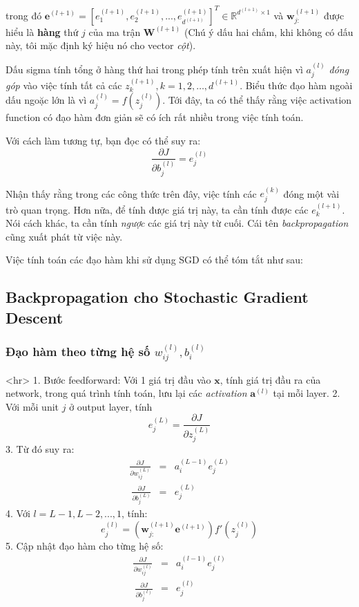 trong đó $\mathbf{e}^{(l+1)} = [e_1^{(l+1)}, e_2^{(l+1)}, ..., e_{d^{(l+1)}}^{(l+1)}]^T \in \mathbb{R}^{d^{(l+1)}\times 1} $ và $\mathbf{w}_{j:}^{(l+1)}$ được hiểu là \textbf{hàng} thứ $j$ của ma trận $\mathbf{W}^{(l+1)}$ (Chú ý dấu hai chấm, khi không có dấu này, tôi mặc định ký hiệu nó cho vector \textit{cột}). 
 
Dấu sigma tính tổng ở hàng thứ hai trong phép tính trên xuất hiện vì $a_{j}^{(l)}$ \textit{đóng góp} vào việc tính tất cả các $z_k^{(l+1)}, k = 1, 2, \dots, d^{(l+1)}$. Biểu thức đạo hàm ngoài dấu ngoặc lớn là vì $a_j^{(l)}  = f(z_j^{(l)})$. Tới đây, ta có thể thấy rằng việc activation function có đạo hàm đơn giản sẽ có ích rất nhiều trong việc tính toán. 
 
Với cách làm tương tự, bạn đọc có thể suy ra: 
\begin{equation*} 
\frac{\partial J}{\partial b_j^{(l)}} = e_j^{(l)} 
\end{equation*} 
 
Nhận thấy rằng trong các công thức trên đây, việc tính các $e_j^{(k)}$ đóng một vài trò quan trọng. Hơn nữa, để tính được giá trị này, ta cần tính được các $e_k^{(l+1)}$. Nói cách khác, ta cần tính \textit{ngược} các giá trị này từ cuối. Cái tên \textit{backpropagation} cũng xuất phát từ việc này. 
 
Việc tính toán các đạo hàm khi sử dụng SGD có thể tóm tắt như sau: 
 
 
\subsection{Backpropagation cho Stochastic Gradient Descent}
 
 
\subsubsection{Đạo hàm theo từng hệ số $w_{ij}^{(l)}, b_{i}^{(l)}$}
<hr> 
1. Bước feedforward: Với 1 giá trị đầu vào $\mathbf{x}$, tính giá trị đầu ra của network, trong quá trình tính toán, lưu lại các \textit{activation} $\mathbf{a}^{(l)}$ tại mỗi layer. 
2. Với mỗi unit $j$ ở output layer, tính \begin{equation*}e_j^{(L)} = \frac{\partial J}{\partial z_j^{(L)}}\end{equation*} 
3. Từ đó suy ra: 
\begin{eqnarray} 
\frac{\partial J}{\partial w_{ij}^{(L)}} &=& a_i^{(L-1)}e_j^{(L)} \\\ 
\frac{\partial J}{\partial b_{j}^{(L)}} &=& e_j^{(L)} 
\end{eqnarray} 
4. Với $l = L-1, L-2, ..., 1$, tính: 
\begin{equation*} 
e_j^{(l)} = \left( \mathbf{w}_{j:}^{(l+1)} \mathbf{e}^{(l+1)} \right) f'(z_j^{(l)}) 
\end{equation*} 
5. Cập nhật đạo hàm cho từng hệ số: 
\begin{eqnarray} 
\frac{\partial J}{\partial w_{ij}^{(l)}} &=& a_i^{(l-1)} e_j^{(l)} \\\ 
\frac{\partial J}{\partial b_{j}^{(l)}} &=& e_j^{(l)} 
\end{eqnarray} 
 

